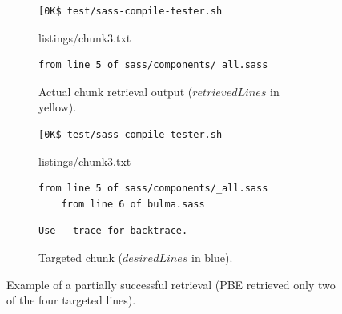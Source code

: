 \begin{figure}[tbp]
  \centering
\begin{subfigure}[b]{\columnwidth}
  \begin{lstlisting}[breaklines=true,frame=tlr]
[0K$ test/sass-compile-tester.sh
  \end{lstlisting}
  \vspace{-\baselineskip}
  
	{listings/chunk3.txt}
  \vspace{-\baselineskip}
  \begin{lstlisting}[breaklines=true,frame=blr]
	from line 5 of sass/components/_all.sass
  \end{lstlisting}
	\caption{Actual chunk retrieval output ($retrievedLines$
	in yellow).}
	\label{lst:pbe-part-success-output}
\end{subfigure}

\begin{subfigure}[b]{\columnwidth}
  \begin{lstlisting}[breaklines=true,frame=tlr]
[0K$ test/sass-compile-tester.sh
  \end{lstlisting}
  \vspace{-\baselineskip}
  
	{listings/chunk3.txt}
  \vspace{-\baselineskip}
  \begin{lstlisting}[backgroundcolor=\color{Cerulean!60},breaklines=true,frame=rl]
	from line 5 of sass/components/_all.sass
	from line 6 of bulma.sass
  \end{lstlisting}
  \vspace{-\baselineskip}
  \begin{lstlisting}[breaklines=true,frame=blr]
  Use --trace for backtrace.
  \end{lstlisting}
	\caption{Targeted chunk ($desiredLines$ in blue).}
	\label{lst:pbe-part-success-desired}
\end{subfigure}
  \caption{Example of a partially successful retrieval
  (PBE retrieved only
  two of the four targeted lines).}
  \label{lst:pbe-partially-successful}
\end{figure}

